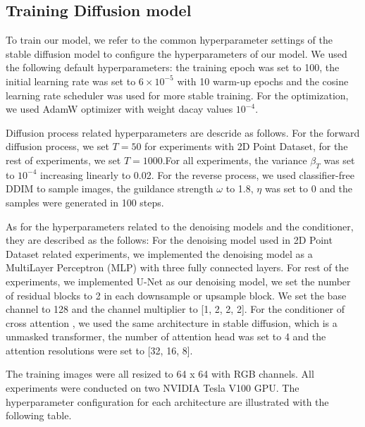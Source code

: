 \subsection{Training Diffusion model}
To train our model, we refer to the common hyperparameter settings of the stable diffusion model to configure the hyperparameters of our model. We used the following default hyperparameters: the training epoch was set to 100, the initial learning rate was set to $6 \times 10^{-5}$ with 10 warm-up epochs and the cosine learning rate scheduler was used for more stable training. For the optimization, we used AdamW optimizer with weight dacay values $10^{-4}$.

Diffusion process related hyperparameters are descride as follows. For the forward diffusion process, we set $T = 50$ for experiments with 2D Point Dataset, for the rest of experiments, we set $T = 1000$.For all experiments, the variance $\beta_T$ was set to $10^{-4}$ increasing linearly to 0.02. For the reverse process, we used classifier-free DDIM to sample images, the guildance strength $\omega$ to 1.8, $\eta$ was set to 0 and the samples were generated in 100 steps.

As for the hyperparameters related to the denoising models and the conditioner, they are described as the follows: For the denoising model used in 2D Point Dataset related experiments, we implemented the denoising model as a MultiLayer Perceptron (MLP) with three fully connected layers. For rest of the experiments, we implemented U-Net as our denoising model, we set the number of residual blocks to 2 in each downsample or upsample block. We set the base channel to 128 and the channel multiplier to [1, 2, 2, 2]. For the conditioner of cross attention , we used the same architecture in stable diffusion, which is a unmasked transformer, the number of attention head was set to 4 and the attention resolutions were set to [32, 16, 8].

The training images were all resized to 64 x 64 with RGB channels. All experiments were conducted on two NVIDIA Tesla V100 GPU.
The hyperparameter configuration for each architecture are illustrated with the following table.



